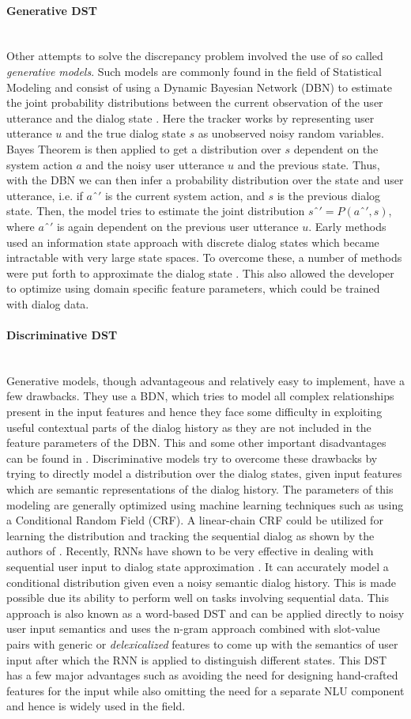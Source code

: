 \documentclass[14pt]{extarticle}
\newcommand{\myparagraph}[1]{\paragraph{#1}\mbox{}\\ \linebreak}
\numberwithin{equation}{section}
\begin{document}
	\myparagraph{Generative DST}
	Other attempts to solve the discrepancy problem involved the use of so called \textit{generative models}. Such models are commonly found in the field of Statistical Modeling and consist of using a Dynamic Bayesian Network (DBN) to estimate the joint probability distributions between the current observation of the user utterance and the dialog state \cite{Young_dst_dbn}. Here the tracker works by representing user utterance $u$ and the true dialog state $s$ as unobserved noisy random variables. Bayes Theorem is then applied to get a distribution over $s$ dependent on the system action $a$ and the noisy user utterance $u$ and the previous state. Thus, with the DBN we can then infer a probability distribution over the state and user utterance, i.e. if $aˆ'$ is the current system action, and $s$ is the previous dialog state. Then, the model tries to estimate the joint distribution $sˆ' = P(aˆ',s)$, where $aˆ'$ is again dependent on the previous user utterance $u$. Early methods used an information state approach with discrete dialog states\cite{roy2000spoken} which became intractable with very large state spaces. To overcome these, a number of methods were put forth to approximate the dialog state \cite{Henderson:2008:MMP:1557690.1557710}\cite{Young:2010:HIS:1621140.1621240}. This also allowed the developer to optimize using domain specific feature parameters, which could be trained with dialog data.
	\myparagraph{Discriminative DST}	
	Generative models, though advantageous and relatively easy to implement, have a few drawbacks.  They use a BDN, which tries to model all complex relationships present in the input features and hence they face some difficulty in exploiting useful contextual parts of the dialog history as they are not included in the feature parameters of the DBN. This and some other important disadvantages can be found in \cite{generative_dst_limitation}. Discriminative models try to overcome these drawbacks by trying to directly model a distribution over the dialog states, given input features which are semantic representations of the dialog history. The parameters of this modeling are generally optimized using machine learning techniques such as using a Conditional Random Field (CRF). A linear-chain CRF could be utilized for learning the distribution and tracking the sequential dialog as shown by the authors of \cite{Lee2013StructuredDM}. Recently, RNNs have shown to be very effective in dealing with sequential user input to dialog state approximation \cite{Henderson2014WordBasedDS}\cite{Henderson_dst_2014}. It can accurately model a conditional distribution given even a noisy semantic dialog history. This is made possible due its ability to perform well on tasks involving sequential data. This approach is also known as a word-based DST and can be applied directly to noisy user input semantics and uses the n-gram approach combined with slot-value pairs with generic or \textit{delexicalized} features to come up with the semantics of user input after which the RNN is applied to distinguish different states\cite{DBLP:journals/corr/MrksicSWTY16}. This DST has a few major advantages such as avoiding the need for designing hand-crafted features for the input while also omitting the need for a separate NLU component and hence is widely used in the field.
\end{document}

